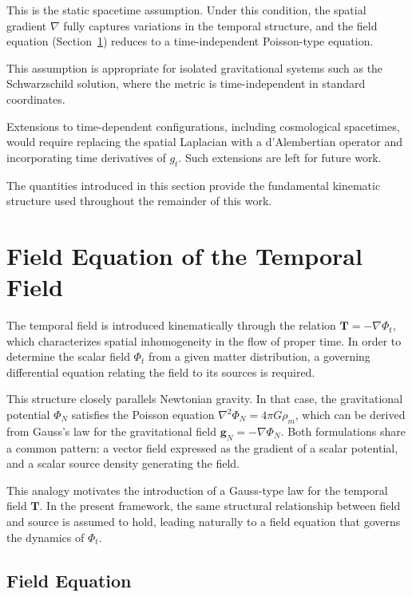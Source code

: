 \documentclass[12pt]{article}
\begin{document}
This is the static spacetime assumption. Under this condition, the spatial gradient $\nabla$ fully captures variations in the temporal structure, and the field equation (Section~\ref{sec:field_equation}) reduces to a time-independent Poisson-type equation.

This assumption is appropriate for isolated gravitational systems such as the Schwarzschild solution, where the metric is time-independent in standard coordinates.

Extensions to time-dependent configurations, including cosmological spacetimes, would require replacing the spatial Laplacian with a d'Alembertian operator and incorporating time derivatives of $g_t$. Such extensions are left for future work.

The quantities introduced in this section provide the fundamental kinematic structure used throughout the remainder of this work.


\section{Field Equation of the Temporal Field}
\label{sec:field_equation}

The temporal field is introduced kinematically through the relation $\mathbf{T} = -\nabla \Phi_t$, which characterizes spatial inhomogeneity in the flow of proper time. In order to determine the scalar field $\Phi_t$ from a given matter distribution, a governing differential equation relating the field to its sources is required.

This structure closely parallels Newtonian gravity. In that case, the gravitational potential $\Phi_N$ satisfies the Poisson equation $\nabla^2 \Phi_N = 4\pi G\rho_m$, which can be derived from Gauss's law for the gravitational field $\mathbf{g}_N = -\nabla \Phi_N$. Both formulations share a common pattern: a vector field expressed as the gradient of a scalar potential, and a scalar source density generating the field.

This analogy motivates the introduction of a Gauss-type law for the temporal field $\mathbf{T}$. In the present framework, the same structural relationship between field and source is assumed to hold, leading naturally to a field equation that governs the dynamics of $\Phi_t$.

\subsection{Field Equation}
\label{sec:field_eq}
\end{document}
